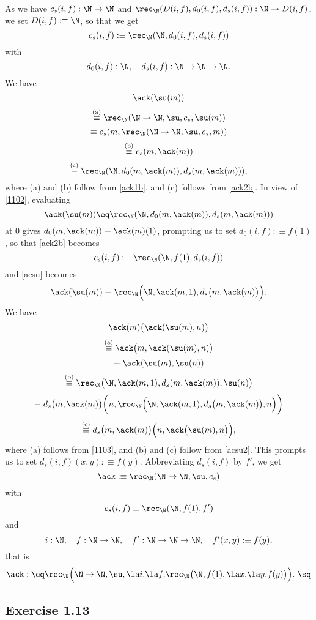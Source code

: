 \documentclass[12pt]{article}
\begin{document}
\nn As we have $c_s(i,f):\N\to\N$ and $\rec_\N(D(i,f),d_0(i,f),d_s(i,f)):\N\to D(i,f)$, we set $D(i,f):\equiv\N$, so that we get 
\begin{equation}\label{ack2b}
c_s(i,f):\equiv\rec_\N(\N,d_0(i,f),d_s(i,f))
\end{equation} 
with 
$$
d_0(i,f):\N,\quad d_s(i,f):\N\to\N\to\N.
$$ 
We have 
%
$$\ack(\su(m))$$
$$\overset{\text{(a)}}\equiv\rec_\N(\N\to\N,\su,c_s,\su(m))$$
$$\equiv c_s(m,\rec_\N(\N\to\N,\su,c_s,m))$$
$$\overset{\text{(b)}}\equiv c_s(m,\ack(m))$$
$$\overset{\text{(c)}}\equiv\rec_\N(\N,d_0(m,\ack(m)),d_s(m,\ack(m))),$$ 
where (a) and (b) follow from \eqref{ack1b}, and (c) follows from \eqref{ack2b}. In view of \eqref{1102}, evaluating 
\begin{equation}\label{acsu}
\ack(\su(m))\eq\rec_\N(\N,d_0(m,\ack(m)),d_s(m,\ack(m)))
\end{equation} 
at 0 gives $d_0(m,\ack(m))\equiv\ack(m)(1)$, prompting us to set $d_0(i,f):\equiv f(1)$, so that \eqref{ack2b} becomes 
\begin{equation}\label{ack2c}
c_s(i,f):\equiv\rec_\N(\N,f(1),d_s(i,f))
\end{equation} 
and \eqref{acsu} becomes
\begin{equation}\label{acsu2}
\ack(\su(m))\equiv\rec_\N\Big(\N,\ack(m,1),d_s\big(m,\ack(m)\big)\Big).
\end{equation} 
We have 
$$\ack(m)\big(\ack(\su(m),n)\big)$$ 
$$\overset{\text{(a)}}\equiv\ack\big(m,\ack(\su(m),n)\big)$$ 
$$\equiv\ack(\su(m),\su(n))$$ 
$$\overset{\text{(b)}}\equiv\rec_\N\big(\N,\ack(m,1),d_s(m,\ack(m)),\su(n)\big)$$ 
$$\equiv d_s\big(m,\ack(m)\big)\bigg(n,\rec_\N\Big(\N,\ack(m,1),d_s\big(m,\ack(m)\big),n\Big)\bigg)$$ 
$$\overset{\text{(c)}}\equiv d_s\big(m,\ack(m)\big)\Big(n,\ack\big(\su(m),n\big)\Big),$$ 
where (a) follows from \eqref{1103}, and (b) and (c) follow from \eqref{acsu2}. This prompts us to set $d_s(i,f)(x,y):\equiv f(y)$. Abbreviating $d_s(i,f)$ by $f'$, we get  
$$
\ack:\equiv\rec_\N(\N\to\N,\su,c_s)
$$ 
with 
$$ 
c_s(i,f)\equiv\rec_\N(\N,f(1),f')
$$ 
and 
$$ 
i:\N,\quad f:\N\to\N,\quad f':\N\to\N\to\N,\quad f'(x,y):\equiv f(y),
$$ 
that is
$$
\ack:\eq\rec_\N\Big(\N\to\N,\su,\la i.\la f.\rec_\N\big(\N,f(1),\la x.\la y.f(y)\big)\Big).\ \sq
$$ 


\subsection{Exercise 1.13}
\end{document}
